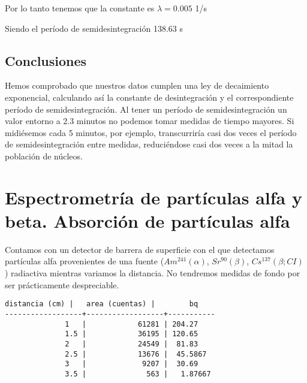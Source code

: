 \documentclass[11pt]{article}
\begin{document}
            
    
    Por lo tanto tenemos que la constante es \(\lambda = 0.005\) 1/s

    
 
            
    
    Siendo el período de semidesintegración 138.63 s

    

    \hypertarget{conclusiones}{%
\subsection{Conclusiones}\label{conclusiones}}

Hemos comprobado que nuestros datos cumplen una ley de decaimiento
exponencial, calculando así la constante de desintegración y el
correspondiente período de semidesintegración. Al tener un período de
semidesintegración un valor entorno a 2.3 minutos no podemos tomar
medidas de tiempo mayores. Si midiésemos cada 5 minutos, por ejemplo,
transcurriría casi dos veces el período de semidesintegración entre
medidas, reduciéndose casi dos veces a la mitad la población de núcleos.

    \hypertarget{espectrometruxeda-de-partuxedculas-alfa-y-beta.-absorciuxf3n-de-partuxedculas-alfa}{%
\section{Espectrometría de partículas alfa y beta. Absorción de
partículas
alfa}\label{espectrometruxeda-de-partuxedculas-alfa-y-beta.-absorciuxf3n-de-partuxedculas-alfa}}

Contamos con un detector de barrera de superficie con el que detectamos
partículas alfa provenientes de una fuente (\(Am^{241}(\alpha)\),
\(Sr^{90}(\beta)\), \(Cs^{137}(\beta; CI)\)) radiactiva mientras
variamos la distancia. No tendremos medidas de fondo por ser
prácticamente despreciable.

    \begin{Verbatim}[commandchars=\\\{\}]
   distancia (cm) |   area (cuentas) |        bq
------------------+------------------+-----------
              1   |            61281 | 204.27
              1.5 |            36195 | 120.65
              2   |            24549 |  81.83
              2.5 |            13676 |  45.5867
              3   |             9207 |  30.69
              3.5 |              563 |   1.87667
    \end{Verbatim}
\end{document}
